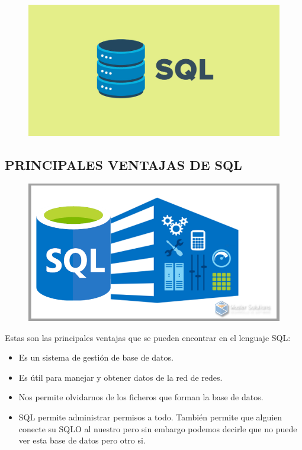 \documentclass[preprint,12pt]{elsarticle}
\begin{document}
\begin{figure}[htb]
				\begin{center}
					\includegraphics[width=15cm]{./IMAGENES/sql}
				\end{center}
			\end{figure}

\subsection{PRINCIPALES VENTAJAS DE SQL}	
\begin{figure}[htb]
				\begin{center}
					\includegraphics[width=15cm]{./IMAGENES/sqldos}
				\end{center}
			\end{figure}
Estas son las principales ventajas que se pueden encontrar en el lenguaje SQL:
\begin{itemize}

\item Es un sistema de gestión de base de datos.
\item Es útil para manejar y obtener datos de la red de redes.
\item Nos permite olvidarnos de los ficheros que forman la base de datos.
\item SQL permite administrar permisos a todo. También  permite que  alguien conecte su SQLO al nuestro pero sin embargo podemos decirle que no puede ver esta base de datos pero otro si.
\end{itemize}
\end{document}
